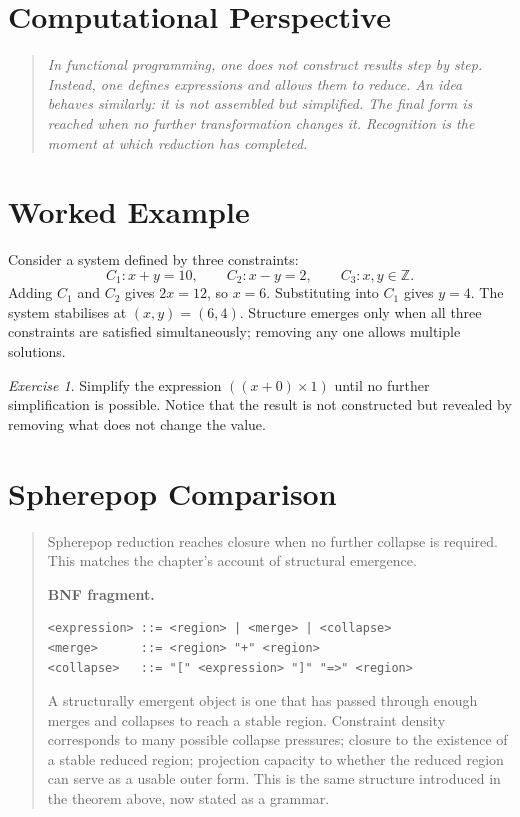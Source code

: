 \documentclass[11pt]{book}
\theoremstyle{plain}
\theoremstyle{definition}
\theoremstyle{remark}
\newtheorem{exercise}[theorem]{Exercise}
\newenvironment{computationalaside}
  {\begin{quote}\small\itshape}
  {\end{quote}}
\newenvironment{spherepopcomparison}
  {\begin{quote}\small}
  {\end{quote}}
\begin{document}
\section*{Computational Perspective}
\begin{computationalaside}
In functional programming, one does not construct results step by step.
Instead, one defines expressions and allows them to reduce. An idea
behaves similarly: it is not assembled but simplified. The final form
is reached when no further transformation changes it. Recognition is the
moment at which reduction has completed.
\end{computationalaside}

\section*{Worked Example}
Consider a system defined by three constraints:
\[
  C_1: x + y = 10, \qquad C_2: x - y = 2, \qquad C_3: x,y \in \mathbb{Z}.
\]
Adding $C_1$ and $C_2$ gives $2x = 12$, so $x = 6$. Substituting into
$C_1$ gives $y = 4$. The system stabilises at $(x,y) = (6,4)$.
Structure emerges only when all three constraints are satisfied
simultaneously; removing any one allows multiple solutions.

\begin{exercise}
Simplify the expression $((x + 0) \times 1)$ until no further simplification
is possible. Notice that the result is not constructed but revealed by
removing what does not change the value.
\end{exercise}

\section*{Spherepop Comparison}
\begin{spherepopcomparison}
Spherepop reduction reaches closure when no further collapse is required.
This matches the chapter's account of structural emergence.

\textbf{BNF fragment.}
\begin{verbatim}
<expression> ::= <region> | <merge> | <collapse>
<merge>      ::= <region> "+" <region>
<collapse>   ::= "[" <expression> "]" "=>" <region>
\end{verbatim}

A structurally emergent object is one that has passed through enough
merges and collapses to reach a stable region. Constraint density
corresponds to many possible collapse pressures; closure to the
existence of a stable reduced region; projection capacity to whether
the reduced region can serve as a usable outer form. This is the same
structure introduced in the theorem above, now stated as a grammar.
\end{spherepopcomparison}
\end{document}
